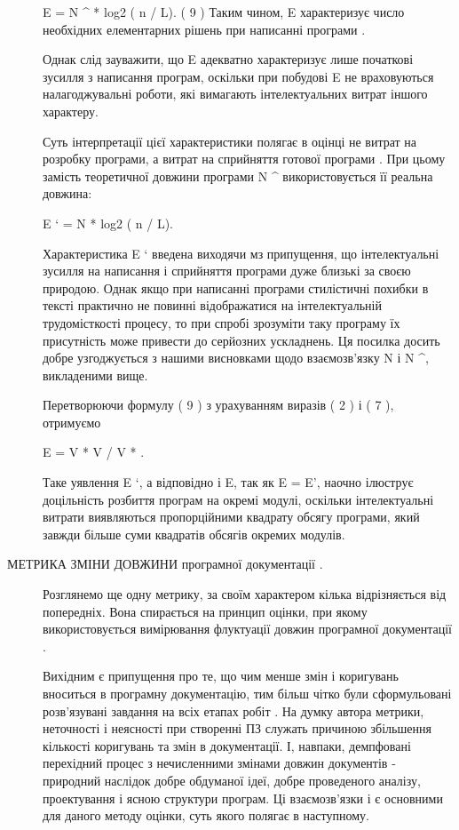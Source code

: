 \begin{description}
E = N \textasciicircum{} * log2 ( n / L). ( 9 )
Таким чином, E характеризує число необхідних елементарних рішень при написанні програми .

Однак слід зауважити, що E адекватно характеризує лише початкові зусилля з написання програм, оскільки при побудові E не враховуються налагоджувальні роботи, які вимагають інтелектуальних витрат іншого характеру.

Суть інтерпретації цієї характеристики полягає в оцінці не витрат на розробку програми, а витрат на сприйняття готової програми . При цьому замість теоретичної довжини програми N \textasciicircum{} використовується її реальна довжина:

E ` = N * log2 ( n / L).

Характеристика E ` введена виходячи мз припущення, що інтелектуальні зусилля на написання і сприйняття програми дуже близькі за своєю природою. Однак якщо при написанні програми стилістичні похибки в тексті практично не повинні відображатися на інтелектуальній трудомісткості процесу, то при спробі зрозуміти таку програму їх присутність може привести до серйозних ускладнень. Ця посилка досить добре узгоджується з нашими висновками щодо взаємозв'язку N і N \textasciicircum{}, викладеними вище.

Перетворюючи формулу ( 9 ) з урахуванням виразів ( 2 ) і ( 7 ), отримуємо

E = V * V / V * .

Таке уявлення E `, а відповідно і E, так як E = E', наочно ілюструє доцільність розбиття програм на окремі модулі, оскільки інтелектуальні витрати виявляються пропорційними квадрату обсягу програми, який завжди більше суми квадратів обсягів окремих модулів.

\item[{МЕТРИКА ЗМІНИ ДОВЖИНИ програмної документації .}] \leavevmode
Розглянемо ще одну метрику, за своїм характером кілька відрізняється від попередніх. Вона спирається на принцип оцінки, при якому використовується вимірювання флуктуації довжин програмної документації .

Вихідним є припущення про те, що чим менше змін і коригувань вноситься в програмну документацію, тим більш чітко були сформульовані розв'язувані завдання на всіх етапах робіт . На думку автора метрики, неточності і неясності при створенні ПЗ служать причиною збільшення кількості коригувань та змін в документації. І, навпаки, демпфовані перехідний процес з нечисленними змінами довжин документів - природний наслідок добре обдуманої ідеї, добре проведеного аналізу, проектування і ясною структури програм. Ці взаємозв'язки і є основними для даного методу оцінки, суть якого полягає в наступному.


\end{description}
